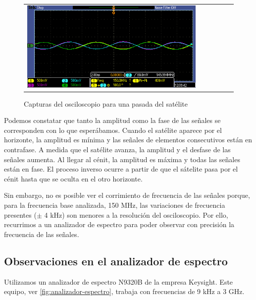 \documentclass{article}
\newenvironment{standalone}{\begin{preview}}{\end{preview}}
\begin{document}
\begin{standalone}
\begin{figure}[!htbp]
\begin{tabular}{lccccc}
      \includegraphics[width=\linewidth/3]{../images/pasada-osciloscopio/pasada9.png}\\
    \end{tabular}

    \caption{Capturas del osciloscopio para una pasada del satélite}
    \label{fig:pasada-osciloscopio}
  \end{figure}

  Podemos constatar que tanto la amplitud como la fase de las señales se corresponden con lo que esperábamos.
  Cuando el satélite aparece por el horizonte, la amplitud es mínima y las señales de elementos consecutivos están en contrafase.
  A medida que el satélite avanza, la amplitud y el desfase de las señales aumenta.
  Al llegar al cénit, la amplitud es máxima y todas las señales están en fase.
  El proceso inverso ocurre a partir de que el sátelite pasa por el cénit hasta que se oculta en el otro horizonte.

  Sin embargo, no es posible ver el corrimiento de frecuencia de las señales porque, para la frecuencia base analizada, 150 MHz, las variaciones de frecuencia presentes ($\pm$ 4 kHz) son menores a la resolución del osciloscopio.
  Por ello, recurrimos a un analizador de espectro para poder observar con precisión la frecuencia de las señales.

  \subsection{Observaciones en el analizador de espectro}

  Utilizamos un analizador de espectro N9320B de la empresa Keysight.
  Este equipo, ver \cref{fig:analizador-espectro}, trabaja con frecuencias de 9 kHz a 3 GHz.


\end{standalone}
\end{document}
